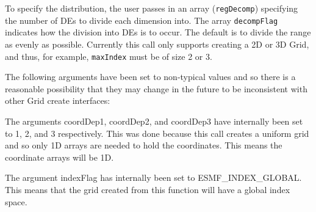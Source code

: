    To specify the distribution, the user passes in an array
   ({\tt regDecomp}) specifying the number of DEs to divide each
   dimension into. The array {\tt decompFlag} indicates how the division into DEs is to
   occur.  The default is to divide the range as evenly as possible. Currently this call
   only supports creating a 2D or 3D Grid, and thus, for example, {\tt maxIndex} must be of size 2 or 3.
  
    The following arguments have been set to non-typical values and so
    there is a reasonable possibility that they may change in the future
    to be inconsistent with other Grid create interfaces:
  
    The arguments coordDep1, coordDep2, and coordDep3 have internally
    been set to 1, 2, and 3 respectively.
    This was done because this call creates a uniform grid and so only 1D arrays
    are needed to hold the coordinates. This means the coordinate arrays
    will be 1D.
  
    The argument indexFlag has internally been set to ESMF\_INDEX\_GLOBAL. This
    means that the grid created from this function will have a global index space.
  

